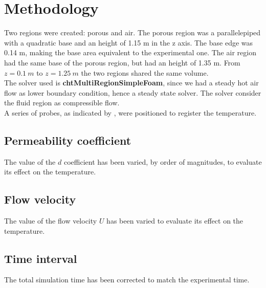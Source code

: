 
\section{Methodology}
\label{section:methodology}

Two regions were created: porous and air.
The porous region was a parallelepiped with a quadratic base and an height of
1.15 m in the z axis. The base edge was 0.14 m, making the base area
equivalent to the experimental one.
The air region had the same base of the porous region, but had an height of
1.35 m.
From $z=0.1 ~m$ to $z=1.25 ~m$ the two regions shared the same volume.\\
The solver used is \textbf{chtMultiRegionSimpleFoam}, since we had a steady hot
air flow as lower boundary condition, hence a steady state solver.
The solver consider the fluid region as compressible flow.\\
A series of probes, as indicated by \textcite{RegionProbe}, were positioned to
register the temperature.

\subsection{Permeability coefficient}
\label{subsection:permeabilitycoefficient}

The value of the $d$ coefficient has been varied, by order of magnitudes, to
evaluate its effect on the temperature.

\subsection{Flow velocity}
\label{subsection:flowvelocity}

The value of the flow velocity $U$ has been varied to
evaluate its effect on the temperature.

\subsection{Time interval}
\label{subsection:timeinterval}

The total simulation time has been corrected to match the experimental time.

\newpage